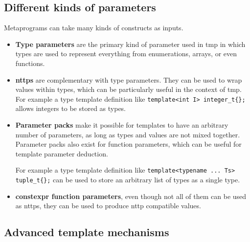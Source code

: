 \documentclass[../main]{subfiles}
\begin{document}
\subsection{
  Different kinds of parameters
}

Metaprograms can take many kinds of \cpp constructs as inputs.

\begin{itemize}

  \item

\textbf{Type parameters} are the primary kind of parameter used in \gls{tmp}
in which types are used to represent everything from enumerations, arrays,
or even functions.

  \item

\textbf{\glspl{nttp}} are complementary with type parameters.
They can be used to wrap values within types, which can be particularly useful
in the context of \gls{tmp}. For example a type template definition like
\lstinline|template<int I> integer_t{};| allows integers to be stored as types.

  \item

\textbf{Parameter packs} make it possible for templates to have an
arbitrary number of parameters, as long as types and values
are not mixed together. Parameter packs also exist for function parameters,
which can be useful for template parameter deduction.

For example a type template definition like
\lstinline|template<typename ... Ts> tuple_t{};| can be used to store an
arbitrary list of types as a single type.

  \item

\textbf{\gls{constexpr} function parameters}, even though not all of them can be
used as \glspl{nttp}, they can be used to produce \gls{nttp} compatible values.

\end{itemize}

\subsection{
  Advanced \cpp template mechanisms
}
\end{document}
